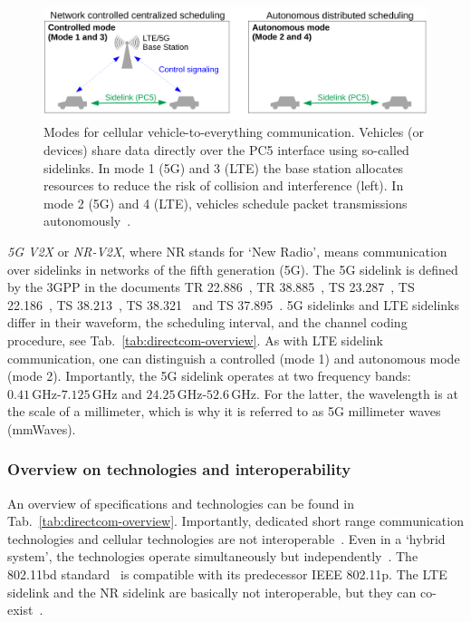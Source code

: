 \begin{figure}[hbt!]
\centering
\includegraphics[width=1.0\textwidth]{../figures/state-of-the-art/mobilecommunication/cellularmodes.pdf} 
\caption[Direct communication scenarios in a cellular network]{Modes for cellular vehicle-to-everything communication. Vehicles (or devices) share data directly over the PC5 interface using so-called sidelinks. In mode 1 (5G) and 3 (LTE) the base station allocates resources to reduce the risk of  collision and interference (left). In mode 2 (5G) and 4 (LTE), vehicles schedule packet transmissions autonomously~\cite{bazzi-2021-com}.  }
\label{fig:scenariosmodes}
\end{figure}





\textit{5G V2X} or \textit{NR-V2X}, where NR stands for `New Radio', means communication over sidelinks in networks of the fifth generation (5G). The 5G sidelink is defined by the 3GPP in the documents TR 22.886~\cite{3gpp-22.886-2018-com}, TR 38.885~\cite{3gpp-38.885-2019-com}, TS 23.287~\cite{3gpp-23.287-2020-com}, TS 22.186~\cite{3gpp-22.186-2019-com}, TS 38.213~\cite{3gpp-38.213-2020-com}, TS 38.321~\cite{3gpp-38.321-2020-com} and TS 37.895~\cite{3gpp-37.895-2020-com}. 
5G sidelinks and LTE sidelinks differ in their waveform, the scheduling interval, and the channel coding procedure, see Tab.~\ref{tab:directcom-overview}. As with LTE sidelink communication, one can distinguish a controlled (mode 1) and autonomous mode (mode 2). 
Importantly, the 5G sidelink operates at two frequency bands: $0.41\,\text{GHz}$-$ 7.125\,\text{GHz}$ and $24.25\,\text{GHz}$-$52.6\,\text{GHz}$. For the latter, the wavelength is at the scale of a millimeter, which is why it is referred to as 5G millimeter waves (mmWaves). 






\subsubsection{Overview on technologies and interoperability}
An overview of specifications and technologies can be found in Tab.~\ref{tab:directcom-overview}.
Importantly, dedicated short range communication technologies and cellular technologies are not interoperable~\cite{molina-2020-com}. Even in a `hybrid system', the technologies operate simultaneously but independently~\cite{shrestha-2020-com}.
The 802.11bd standard~\cite{ieee802.11bd-2022-com} is compatible with its predecessor IEEE 802.11p. The LTE sidelink and the NR sidelink are basically not interoperable, but they can co-exist~\cite{bazzi-2021-com}. 



